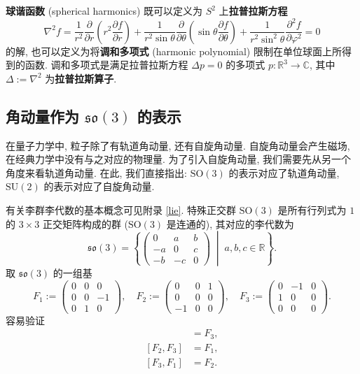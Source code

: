 {\bf 球谐函数} (spherical harmonics) 既可以定义为 $ S^2 $ 上{\bf 拉普拉斯方程}
\[ \nabla^2f=\frac{1}{r^2}\frac{\partial}{\partial r}\left( r^2\frac{\partial f}{\partial r} \right)+\frac{1}{r^2\sin\theta}\frac{\partial}{\partial\theta}\left( \sin\theta\frac{\partial f}{\partial\theta} \right)+\frac{1}{r^2\sin^2\theta}\frac{\partial^2 f}{\partial\varphi^2}=0 \]
的解, 也可以定义为将{\bf 调和多项式} (harmonic polynomial) 限制在单位球面上所得到的函数. 调和多项式是满足拉普拉斯方程 $ \Delta p=0 $ 的多项式 $ p:\mathbb{R}^3\to\mathbb{C} $, 其中 $ \Delta:=\nabla^2 $ 为{\bf 拉普拉斯算子}.
\subsection{角动量作为 \texorpdfstring{$ \mathfrak{so}(3) $}{so3} 的表示}
在量子力学中, 粒子除了有轨道角动量, 还有自旋角动量. 自旋角动量会产生磁场, 在经典力学中没有与之对应的物理量. 为了引入自旋角动量, 我们需要先从另一个角度来看轨道角动量. 在此, 我们直接指出: $ \mathrm{SO}(3) $ 的表示对应了轨道角动量, $ \mathrm{SU}(2) $ 的表示对应了自旋角动量.

有关李群李代数的基本概念可见附录 \ref{lie}. 特殊正交群 $ \mathrm{SO}(3) $ 是所有行列式为 $ 1 $ 的 $ 3\times 3 $ 正交矩阵构成的群 ($ \mathrm{SO}(3) $ 是连通的), 其对应的李代数为
\[ \mathfrak{so}(3)=\left\{ \left( \begin{matrix}
    0 & a & b\\ 
    -a & 0 & c\\ 
    -b & -c & 0
\end{matrix} \right) \;\middle|\; a,b,c\in\mathbb{R} \right\}. \]
取 $ \mathfrak{so}(3) $ 的一组基 
\[ F_1:=\left( \begin{matrix}
    0 & 0 & 0\\ 
    0 & 0 & -1\\ 
    0 & 1 & 0
\end{matrix} \right),\quad F_2:=\left(\begin{matrix}
    0 & 0 & 1\\ 
    0 & 0 & 0\\ 
    -1 & 0 & 0
\end{matrix}\right),\quad F_3:=\left(\begin{matrix}
    0 & -1 & 0\\ 
    1 & 0 & 0\\ 
    0 & 0 & 0
\end{matrix}\right). \]
容易验证
\begin{align*}
    [F_1,F_2] &= F_3,\\ 
    [F_2,F_3] &= F_1,\\ 
    [F_3,F_1] &= F_2.
\end{align*}

